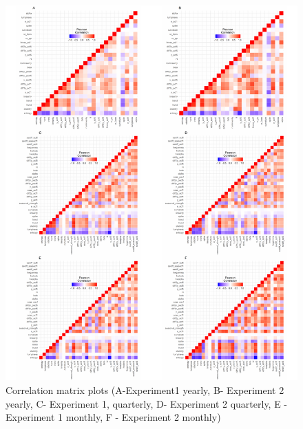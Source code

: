 \documentclass[11pt,]{article}
\theoremstyle{definition}
\theoremstyle{definition}
\theoremstyle{definition}
\theoremstyle{remark}
\begin{document}
\begin{figure}

{\centering \includegraphics[width=\textwidth]{figure/cormat-1} 

}

\caption{ Correlation matrix plots (A-Experiment1 yearly, B- Experiment 2 yearly, C- Experiment 1, quarterly, D- Experiment 2 quarterly, E - Experiment 1 monthly, F - Experiment 2 monthly)}\label{fig:cormat}
\end{figure}
\end{document}

